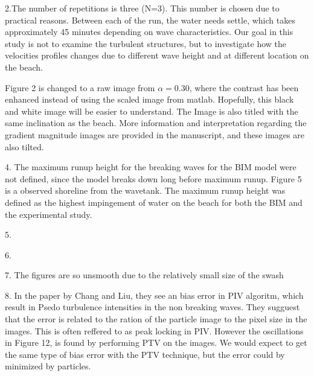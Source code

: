 2.The number of repetitions is three (N=3). This number is chosen due to practical reasons. Between each of the run, the water needs settle, which takes approximately 45 minutes depending on wave characteristics. Our goal in this study is not to examine the turbulent structures, but to investigate how the velocities profiles changes due to different wave height and at different location on the beach.


Figure 2 is changed to a raw image from $\alpha=0.30$, where the contrast has been enhanced instead of using the scaled image from matlab. Hopefully, this black and white image will be easier to understand. The Image is also titled with the same inclination as the beach. More information and interpretation regarding the gradient magnitude images are provided in the manuscript, and these images are also tilted.



4. The maximum runup height for the breaking waves for the BIM model were not defined, since the model breaks down long before maximum runup. Figure 5 is a observed shoreline from the wavetank. The maximum runup height was defined as the highest impingement of water on the beach for both the BIM and the experimental study. 

5.


6. 

7. The figures are so unsmooth due to the relatively small size of the swash 


8. In the paper by Chang and Liu, they see an bias error in PIV algoritm, which result in Psedo turbulence intensities in the non breaking waves. They sugguest that the error is related to the ration of the particle image to the pixel size in the images. This is often reffered to as peak locking in PIV. However the oscillations in Figure 12, is found by  performing PTV on the images. We would expect to get the same type of bias error with the PTV technique, but the error could by minimized by particles. 
